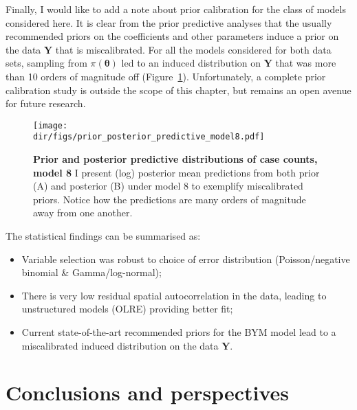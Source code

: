 Finally, I would like to add a note about prior calibration for the class of models considered here.
It is clear from the prior predictive analyses that the usually recommended priors on the coefficients and other parameters induce a prior on the data $\boldsymbol Y$ that is miscalibrated.
For all the models considered for both data sets, sampling from $\pi(\boldsymbol\theta)$ led to an induced distribution  on $\boldsymbol Y$ that was more than 10 orders of magnitude off (Figure~\ref{fig:predictiveY}).
Unfortunately, a complete prior calibration study is outside the scope of this chapter, but remains an open avenue for future research.

\begin{figure}[htbp]
  \centering
  \texttt{[image: \\dir/figs/prior\_posterior\_predictive\_model8.pdf]}
  \caption[Prior and posterior predictive distributions of case counts, model 8]{\textbf{Prior and posterior predictive distributions of case counts, model 8}
  I present (log) posterior mean predictions from both prior (A) and posterior (B) under model 8 to exemplify miscalibrated priors.
  Notice how the predictions are many orders of magnitude away from one another.
  }
  \label{fig:predictiveY}
\end{figure}

The statistical findings can be summarised as:
\begin{itemize}
 \item Variable selection was robust to choice of error distribution (Poisson/negative binomial \& Gamma/log-normal);
 \item There is very low residual spatial autocorrelation in the data, leading to unstructured models (OLRE) providing better fit;
 \item Current state-of-the-art recommended priors for the BYM model lead to a miscalibrated induced distribution on the data $\boldsymbol Y$.
\end{itemize}


\section{Conclusions and perspectives}

